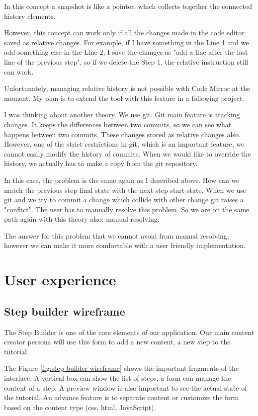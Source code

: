 \documentclass[11pt, a4paper, oneside, openright, medskipamount]{report}
\begin{document}
In this concept a snapshot is like a pointer, which collects together the connected history elements.

However, this concept can work only if all the changes made in the code editor saved as relative changes. For example, if I have something in the Line 1 and we add something else in the Line 2, I save the changes as "add a line after the last line of the previous step", so if we delete the Step 1, the relative instruction still can work.

Unfortunately, managing relative history is not possible with Code Mirror at the moment. My plan is to extend the tool with this feature in a following project.

I was thinking about another theory. We use git. Git main feature is tracking changes. It keeps the differences between two commits, so we can see what happens between two commits. These changes stored as relative changes also. However, one of the strict restrictions in git, which is an important feature, we cannot easily modify the history of commits. When we would like to override the history, we actually has to make a copy from the git repository.

In this case, the problem is the same again as I described above. How can we match the previous step final state with the next step start state. When we use git and we try to commit a change which collide with other change git raises a "conflict". The user has to manually resolve this problem. So we are on the same path again with this theory also: manual resolving.

The answer for this problem that we cannot avoid from manual resolving, however we can make it more comfortable with a user friendly implementation.

\section{User experience}

\subsection{Step builder wireframe}

The Step Builder is one of the core elements of our application. Our main content creator persona will use this form to add a new content, a new step to the tutorial.

The Figure \ref{fig:step-builder-wireframe} shows the important fragments of the interface. A vertical box can show the list of steps, a form can manage the content of a step. A preview window is also important to see the actual state of the tutorial. An advance feature is to separate content or customize the form based on the content type (css, html, JavaScript).
\end{document}

